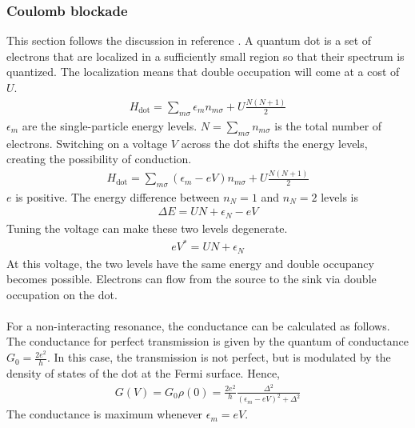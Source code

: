 \documentclass[twoside,11pt]{report}
\numberwithin{equation}{section}
\begin{document}
\subsubsection{Coulomb blockade}
This section follows the discussion in reference \cite{piers}. A quantum dot is a set of electrons that are localized in a sufficiently small region so that their spectrum is quantized.
The localization means that double occupation will come at a cost of \(U\).
\begin{equation}\begin{aligned}
H_\text{dot} = \sum_{m\sigma} \epsilon_m n_{m\sigma} + U\frac{N(N+1)}{2}
\end{aligned}\end{equation}
\(\epsilon_m\) are the single-particle energy levels.
\(N =\sum_{m\sigma} n_{m\sigma}\) is the total number of electrons.
Switching on a voltage \(V\) across the dot shifts the energy levels, creating the possibility of conduction.
\begin{equation}\begin{aligned}
	H_\text{dot} = \sum_{m\sigma} \left(\epsilon_m -eV\right) n_{m\sigma} + U\frac{N(N+1)}{2}
\end{aligned}\end{equation}
\(e\) is positive.
The energy difference between \(n_{N}=1\) and \(n_N = 2\) levels is
\begin{equation}\begin{aligned}
\Delta E = UN + \epsilon_{N} -eV
\end{aligned}\end{equation}
Tuning the voltage can make these two levels degenerate.
\begin{equation}\begin{aligned}
eV^* = UN + \epsilon_{N}
\end{aligned}\end{equation}
At this voltage, the two levels have the same energy and double occupancy becomes possible.
Electrons can flow from the source to the sink via double occupation on the dot.\\\\
For a non-interacting resonance, the conductance can be calculated as follows.
The conductance for perfect transmission is given by the quantum of conductance \(G_0 = \frac{2e^2}{h}\).
In this case, the transmission is not perfect, but is modulated by the density of states of the dot at the Fermi surface.
Hence,
\begin{equation}\begin{aligned}
	G(V) = G_0 \rho(0) = \frac{2e^2}{h} \frac{\Delta^2}{\left(\epsilon_m - eV\right)^2 + \Delta^2}
\end{aligned}\end{equation}
The conductance is maximum whenever \(\epsilon_m = eV\).
\end{document}
